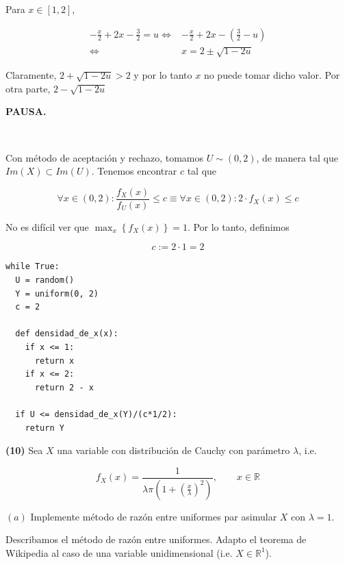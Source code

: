 \documentclass[a4paper, 12pt]{article}
\begin{document}
Para $x \in [1, 2]$,

\begin{align*}
  -\frac{x}{2} + 2x - \frac{3}{2} = u 
  \iff& -\frac{x}{2} + 2x - \left(\frac{3}{2}
    - u\right) \\ 
    \iff& x = 2\pm \sqrt{1 - 2u} 
\end{align*}

Claramente, $2 + \sqrt{1 - 2u} > 2 $ y por lo tanto $x$ no puede tomar dicho
valor. Por otra parte, $2 - \sqrt{1 - 2u} $

\textbf{PAUSA.}

~

Con método de aceptación y rechazo, tomamos $U \sim (0, 2)$, de manera tal que
$Im(X) \subset Im(U)$. Tenemos encontrar $c$ tal que 

\begin{equation*}
  \forall x \in (0, 2) : \frac{ f_X(x) }{f_U(x)} \leq c \equiv \forall x \in (0,
  2) : 2\cdot f_X(x) \leq c
\end{equation*}

No es difícil ver que $\max_x \left\{ f_X(x) \right\} = 1 $. Por lo tanto,
definimos 

\begin{equation*}
  c := 2 \cdot 1  = 2
\end{equation*}

\footnotesize 

\begin{verbatim}
while True:
  U = random()
  Y = uniform(0, 2)
  c = 2

  def densidad_de_x(x):
    if x <= 1: 
      return x 
    if x <= 2:
      return 2 - x

  if U <= densidad_de_x(Y)/(c*1/2):
    return Y
\end{verbatim}

\pagebreak 

\begin{myframe}
  \textbf{(10)} Sea $X$ una variable con distribución de Cauchy con parámetro
  $\lambda$, i.e. 

  \begin{equation*}
    f_X(x) = \frac{1}{\lambda \pi \left( 1 + \left( \frac{x}{\lambda} \right)^2
    \right) }, \qquad x \in \mathbb{R}
  \end{equation*}

  $(a)$ Implemente método de razón entre uniformes par asimular $X$ con
  $\lambda = 1$.
\end{myframe}

Describamos el método de razón entre uniformes. Adapto el teorema de Wikipedia
al caso de una variable unidimensional (i.e. $X \in \mathbb{R}^1$). 
\end{document}
